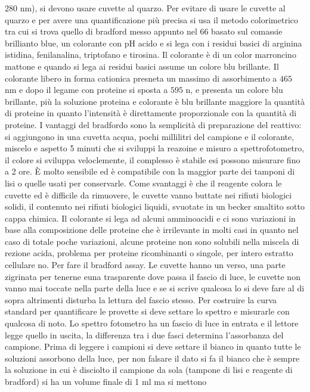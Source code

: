 280 nm), si devono usare cuvette al quarzo. Per evitare di usare le cuvette al quarzo e per avere una quantificazione pi\`u precisa si usa il metodo colorimetrico tra cui si trova quello
di bradford messo appunto nel 66 basato sul comassie brillianto blue, un colorante con pH acido e si lega con i residui basici di arginina istidina, fenilanalina, triptofano e tirosina.
Il colorante \`e di un color marroncino mattone e quando si lega ai residui basici assume un colore blu brillante. Il colorante libero in forma cationica presneta un massimo di 
assorbimento a $465$ nm e dopo il legame con proteine si sposta a $595$ n, e presenta un colore blu brillante, pi\`u la soluzione proteina e colorante \`e blu brillante maggiore la 
quantit\`a di proteine in quanto l'intensit\`a \`e direttamente proporzionale con la quantit\`a di proteine. I vantaggi del bradfordo sono la semplicit\`a di preparazione del reattivo:
si aggiungono in una cuvetta acqua, pochi millilitri del campione e il colorante, miscelo e aspetto 5 minuti che si sviluppi la reazoine e misuro a spettrofotometro, il colore si 
sviluppa veloclemente, il complesso \`e stabile esi possono misurare fino a 2 ore. \`E molto sensibile ed \`e compatibile con la maggior parte dei tamponi di lisi o quelle usati per 
conservarle. Come svantaggi \`e che il reagente colora le cuvette ed \`e difficile da rimuovere, le cuvette vanno buttate nei rifiuti biologici solidi, il contenuto nei rifiuti 
biologici liquidi, svuotate in un becker smaltito sotto cappa chimica. Il colorante si lega ad alcuni amminoacidi e ci sono variazioni in base alla composizione delle proteine che \`e
irrilevante in molti casi in quanto nel caso di totale poche variazioni, alcune proteine non sono solubili nella miscela di rezione acida, problema per proteine ricombinanti o singole, 
per intero estratto cellulare no. Per fare il bradford assay. Le cuvette hanno un verso, una parte zigrinata per tenerne euna trasparente dove passa il fascio di luce, le cuvette non
vanno mai toccate nella parte della luce e se si scrive qualcosa lo si deve fare al di sopra altrimenti disturba la lettura del fascio stesso. Per costruire la curva standard per 
quantificare le provette si deve settare lo spettro e misurarle con qualcosa di noto. Lo spettro fotometro ha un fascio di luce in entrata e il lettore legge quello in uscita, la
differenza tra i due fasci determina l'assorbanza del campione. Prima di leggere i campioni si deve settare il bianco in quanto tutte le soluzioni assorbono della luce, per non
falsare il dato si fa il bianco che \`e sempre la soluzione in cui \`e disciolto il campione da sola (tampone di lisi e reagente di bradford) si ha un volume finale di 1 ml ma si mettono
